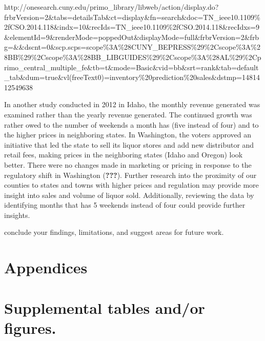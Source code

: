 \documentclass[]{elsarticle} %
\begin{document}
http://onesearch.cuny.edu/primo\_library/libweb/action/display.do?frbrVersion=2\&tabs=detailsTab\&ct=display\&fn=search\&doc=TN\_ieee10.1109\%2fCSO.2014.118\&indx=10\&recIds=TN\_ieee10.1109\%2fCSO.2014.118\&recIdxs=9\&elementId=9\&renderMode=poppedOut\&displayMode=full\&frbrVersion=2\&frbg=\&\&dscnt=0\&scp.scps=scope\%3A\%28CUNY\_BEPRESS\%29\%2Cscope\%3A\%28BB\%29\%2Cscope\%3A\%28BB\_LIBGUIDES\%29\%2Cscope\%3A\%28AL\%29\%2Cprimo\_central\_multiple\_fe\&tb=t\&mode=Basic\&vid=bb\&srt=rank\&tab=default\_tab\&dum=true\&vl(freeText0)=inventory\%20prediction\%20sales\&dstmp=1481412549638

In another study conducted in 2012 in Idaho, the monthly revenue
generated was examined rather than the yearly revenue generated. The
continued growth was rather owed to the number of weekends a month has
(five instead of four) and to the higher prices in neighboring states.
In Washington, the voters approved an initiative that led the state to
sell its liquor stores and add new distributor and retail fees, making
prices in the neighboring states (Idaho and Oregon) look better. There
were no changes made in marketing or pricing in response to the
regulatory shift in Washington ({\textbf{???}}). Further research into
the proximity of our counties to states and towns with higher prices and
regulation may provide more insight into sales and volume of liquor
sold. Additionally, reviewing the data by identifying months that has 5
weekends instead of four could provide further insights.

conclude your findings, limitations, and suggest areas for future work.

\newpage

\section{Appendices}\label{appendices}

\section{Supplemental tables and/or
figures.}\label{supplemental-tables-andor-figures.}
\end{document}
